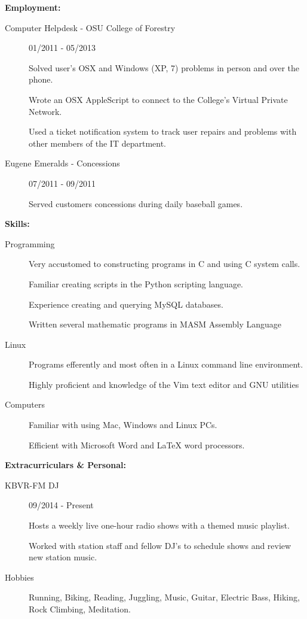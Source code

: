 \documentclass[11pt]{article}
\begin{document}
{\Large \bf Employment:}
\begin{description}

\item[Computer Helpdesk - OSU College of Forestry]
    \hfill 01/2011 - 05/2013

    Solved user's OSX and Windows (XP, 7) problems in person and over the phone.

    Wrote an OSX AppleScript to connect to the College's Virtual Private
    Network.

    Used a ticket notification system to track user repairs and problems
    with other members of the IT department.

\item[Eugene Emeralds - Concessions]
    \hfill 07/2011 - 09/2011

    Served customers concessions during daily baseball games.

\end{description}
{\Large \bf Skills:}
\begin{description}

    \item[Programming] 
    \hfill

        Very accustomed to constructing programs in C and using C system calls.

        Familiar creating scripts in the Python scripting language.

        Experience creating and querying MySQL databases.

        Written several mathematic programs in MASM Assembly Language

    \item[Linux]
    \hfill
    
        Programs efferently and most often in a Linux command line environment.

        Highly proficient and knowledge of the Vim text editor and GNU utilities

    \item[Computers] 
    \hfill

        Familiar with using  Mac, Windows and Linux PCs.
        
        Efficient with Microsoft Word and LaTeX word processors.

\end{description}
{\Large \bf Extracurriculars \& Personal:}
\begin{description}

    \item[KBVR-FM DJ]
        \hfill  09/2014 - Present

        Hosts a weekly live one-hour radio shows with a themed music playlist.

        Worked with station staff and fellow DJ's to schedule shows and
        review new station music.

    \item[Hobbies]
    \hfill

        Running, Biking, Reading, Juggling, Music, Guitar, Electric Bass, Hiking,
        Rock Climbing, Meditation.
    
\end{description}
\end{document}
